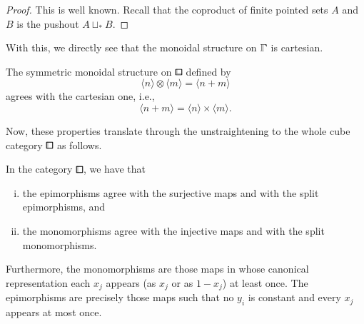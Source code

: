 \begin{proof}
This is well known.
Recall that the coproduct of finite pointed sets $A$ and $B$ is the pushout $A\sqcup_\ast B$.
\end{proof}

With this, we directly see that the monoidal structure on $\bbGamma$ is cartesian.

\begin{corollary}\label{rem:bblox-symm-monoid}
The symmetric monoidal structure on $\bblox$ defined by
\[
    \langle n\rangle \otimes\langle m\rangle =\langle n+m\rangle
\]
agrees with the cartesian one, i.e.,
\[
    \langle n+m\rangle=\langle n\rangle \times\langle m\rangle.
\]
\end{corollary}

Now, these properties translate through the unstraightening to the whole cube category $\bbox$ as follows.

\begin{lemma}\label{lem:bbox-epi-mono}
In the category $\bbox$, we have that
\begin{enumerate}[(i)]
    \item the epimorphisms agree with the surjective maps and with the split epimorphisms, and
    \item the monomorphisms agree with the injective maps and with the split monomorphisms.
\end{enumerate}
Furthermore, the monomorphisms are those maps in whose canonical representation
each $x_j$ appears (as $x_j$ or as $1 - x_j$) at least once.
The epimorphisms are precisely those maps such that no $y_i$ is constant and every $x_j$ appears at most once.
\end{lemma}


